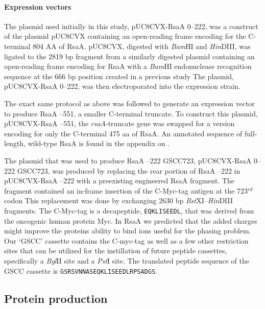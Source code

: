 \paragraph{Expression vectors} The plasmid used initially in this study, pUC8CVX-RsaA \del{}0--222, was a construct of the plasmid pUC8CVX containing an open-reading frame encoding for the C-terminal 804 AA of RsaA. pUC8CVX, digested with \textit{Bam}HI and \textit{Hin}DIII, was ligated to the 2819 bp fragment from a similarly digested plasmid containing an open-reading frame encoding for RsaA with a \textit{Bam}HI  endonuclease recognition sequence at the 666 bp position created in a previous study The plasmid, pUC8CVX-RsaA \del{}0--222, was then electroporated into the expression strain. 

The exact same protocol as above was followed to generate an expression vector to produce RsaA --551, a smaller C-terminal truncate. To construct this plasmid, pUC8CVX-RsaA --551, the \textit{rsaA}-truncate gene was swapped for a version encoding for only the C-terminal 475 \ac{aa} of RsaA. An annotated sequence of full-length, wild-type RsaA is found in the appendix on .

The plasmid that was used to produce RsaA --222 GSCC723, pUC8CVX-RsaA \del{}0--222 GSCC723, was produced by replacing the rear portion of RsaA --222 in pUC8CVX-RsaA --222 with a preexisting engineered RsaA fragment. The fragment contained an in-frame insertion of the C-Myc-tag antigen at the 723$^{rd}$ codon This replacement was done by exchanging 2630 bp \textit{Bst}XI--\textit{Hin}DIII fragments. The C-Myc-tag is a decapeptide, \texttt{EQKLISEEDL}, that was derived from the oncogenic human protein Myc. In RsaA we predicted that the added charges might improve the proteins ability to bind  ions useful for the phasing problem. Our `GSCC' cassette contains the C-myc-tag as well as a few other restriction sites that can be utilized for the instillation of future peptide cassettes, specifically a \textit{Bgl}II site and a \textit{Pst}I site. The translated peptide sequence of the GSCC cassette is \texttt{GSRSVNNASEQKLISEEDLRPSADGS}. 

\subsection{Protein production}
\label{sub:crystal-protein-production}

